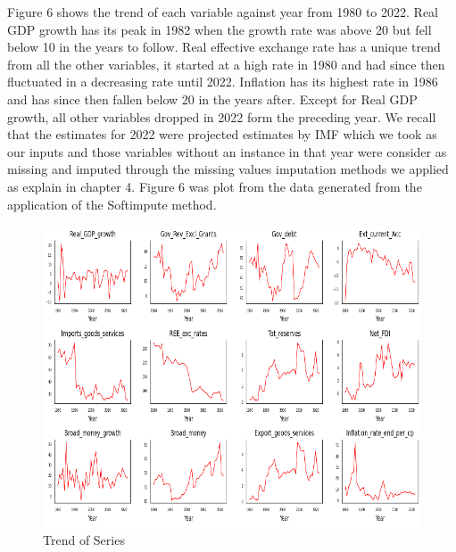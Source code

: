 \documentclass[12pt,italian, twoside]{report}
\begin{document}
Figure 6 shows the trend of each variable against year from 1980 to 2022. Real GDP growth has its peak in 1982 when the growth rate was above 20 but fell below 10 in the years to follow. Real effective exchange rate has a unique trend from all the other variables, it started at a high rate in 1980 and had since then fluctuated in a decreasing rate until 2022. Inflation has its highest rate in 1986 and has since then fallen below 20 in the years after. Except for Real GDP growth, all other variables dropped in 2022 form the preceding year. We recall that the estimates for 2022 were projected estimates by IMF which we took as our inputs and those variables without an instance in that year were consider as missing and imputed through the missing values imputation methods we applied as explain in chapter 4. Figure 6 was plot from the data generated from the application of the Softimpute method.\\
	\begin{figure}[t]
	\centering
	\includegraphics[width = 145mm]{immagini/trend.png}
	\caption{Trend of Series}
	\label{fig:trend}
\end{figure}
\end{document}
